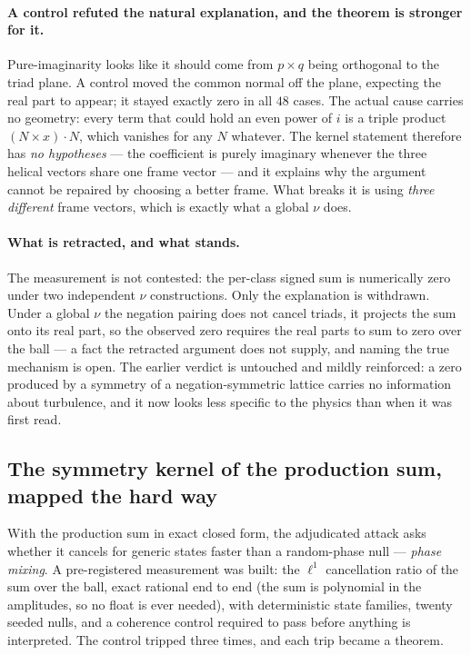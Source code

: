 \documentclass[11pt,a4paper]{article}
\theoremstyle{definition}
\theoremstyle{plain}
\begin{document}
\paragraph{A control refuted the natural explanation, and the theorem is stronger for it.}
Pure-imaginarity looks like it should come from $p\times q$ being orthogonal to the triad plane. A
control moved the common normal off the plane, expecting the real part to appear; it stayed exactly
zero in all $48$ cases. The actual cause carries no geometry: every term that could hold an even
power of $i$ is a triple product $(N\times x)\cdot N$, which vanishes for any $N$ whatever. The
kernel statement therefore has \emph{no hypotheses} --- the coefficient is purely imaginary whenever
the three helical vectors share one frame vector --- and it explains why the argument cannot be
repaired by choosing a better frame. What breaks it is using \emph{three different} frame vectors,
which is exactly what a global $\nu$ does.

\paragraph{What is retracted, and what stands.}
The measurement is not contested: the per-class signed sum is numerically zero under two independent
$\nu$ constructions. Only the explanation is withdrawn. Under a global $\nu$ the negation pairing
does not cancel triads, it projects the sum onto its real part, so the observed zero requires the
real parts to sum to zero over the ball --- a fact the retracted argument does not supply, and
naming the true mechanism is open. The earlier verdict is untouched and mildly reinforced: a zero
produced by a symmetry of a negation-symmetric lattice carries no information about turbulence, and
it now looks less specific to the physics than when it was first read.

\subsection{The symmetry kernel of the production sum, mapped the hard way}
\label{sec:kernelmap}

With the production sum in exact closed form, the adjudicated attack asks whether it cancels for
generic states faster than a random-phase null --- \emph{phase mixing}. A pre-registered
measurement was built: the $\ell^1$ cancellation ratio of the sum over the ball, exact rational
end to end (the sum is polynomial in the amplitudes, so no float is ever needed), with
deterministic state families, twenty seeded nulls, and a coherence control required to pass
before anything is interpreted. The control tripped three times, and each trip became a theorem.
\end{document}
